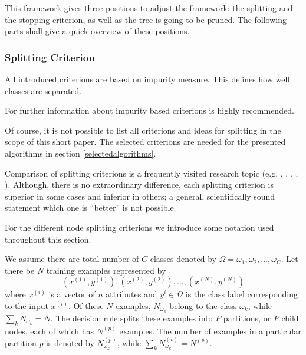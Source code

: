 This framework gives three positions to adjust the framework: the splitting and the stopping criterion, as well as the tree is going to be pruned. The following parts shall give a quick overview of these positions. 

\newpage

\subsubsection{Splitting Criterion}

All introduced criterions are based on impurity measure. This defines how well classes are separated. 

\begin{remark}
 For further information about impurity based criterions \cite[p. 53 ff.]{rokach2008data} is highly recommended.
\end{remark}

Of course, it is not possible to list all criterions and ideas for splitting in the scope of this short paper. The selected criterions are needed for the presented algorithms in section \ref{selectedalgorithms}. 

Comparison of splitting criterions is a frequently visited research topic (e.g. \cite{breiman1996technical}, \cite{buntine1992further}, \cite{mingers1989empirical}, \cite{drummond2000exploiting}, \cite{shih1999families}). Although, there is no extraordinary difference, each splitting criterion is superior in some cases and inferior in others; a general, scientifically sound statement which one is ``better'' is not possible. 

For the different node splitting criterions we introduce some notation used throughout this section.

We assume there are total number of $C$ classes denoted by $\Omega = {\omega_1, \omega_2, \dots, \omega_C}$. Let there be $N$ training examples represented by
\begin{equation}
    \left(x^{(1)}, y^{(1)} \right), \left(x^{(2)}, y^{(2)} \right), \dots, \left(x^{(N)}, y^{(N)} \right)
\end{equation}
where $x^{(i)}$ is a vector of $n$ attributes and $y^{i} \in \Omega$ is the class label corresponding to the input $x^{(i)}$. Of these $N$ examples, $N_{\omega_k}$ belong to the class $\omega_k$, while $\sum_k N_{\omega_k} = N$. The decision rule splits these examples into $P$ partitions, or $P$ child nodes, each of which has $N^(p)$ examples. The number of examples in a particular partition $p$ is denoted by $N^{(p)}_{\omega_k}$, while $\sum_k N^{(v)}_{\omega_k} = N^{(p)}$.


